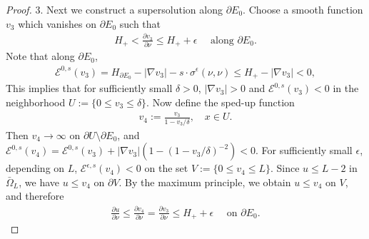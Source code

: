 \documentclass[10pt,a4paper]{amsart}
\begin{document}
\begin{proof}
3. Next we construct a supersolution along $\partial E_0$. Choose a smooth function $v_3$ which vanishes on $\partial E_0$ such that 
\begin{align*}
	H_{+} < \frac{\partial v_3}{\partial \nu } \leq H_+  + \epsilon \quad \text{ along } \partial E_0.
\end{align*}
Note that along $\partial E_0$, 
\begin{align*}
	\mathcal{E}^{0, s}(v_3) = H_{\partial E_0} - |\nabla v_3| - s \cdot \sigma ^{\epsilon } (\nu ,\nu ) \leq H_{+}   - |\nabla v_3| <0, 
\end{align*}
This implies that for sufficiently small $\delta >0$, $|\nabla v_3|>0$ and $\mathcal{E}^{0,s}(v_3)<0$ in the neighborhood $U:= \{ 0 \leq v_3 \leq \delta \} $. Now define the sped-up function
 \begin{align*}
	v_4 := \frac{v_3}{1- v_3 / \delta },\quad x \in U.
\end{align*} 
Then $v_4 \to \infty$ on $\partial U \setminus \partial E_0$, and $\mathcal{E}^{0,s}(v_4) = \mathcal{E}^{0,s}(v_3) + |\nabla v_3|\left( 1- (1- v_3 / \delta )^{-2} \right) <0 $. For sufficiently small $\epsilon $, depending on $L$, $\mathcal{E}^{\epsilon ,s}(v_4) <0 $ on the set $V:= \{0 \leq v_4 \leq L\} $. Since $u \leq L-2$ in $\bar{\Omega }_{L}$, we have $u \leq v_4$ on $\partial V$. By the maximum principle, we obtain $u \leq v_4$ on $V$, and therefore
\begin{align}\label{v4-upper}
	\frac{\partial u}{\partial \nu } \leq \frac{\partial v_4}{\partial \nu }= \frac{\partial v_3}{\partial \nu } \leq H_+ + \epsilon \quad \text{ on } \partial E_0.
\end{align} 


\end{proof}
\end{document}
